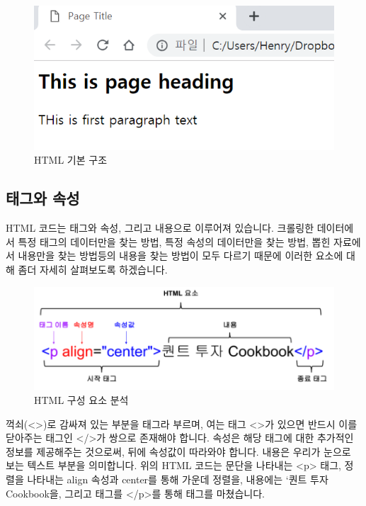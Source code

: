 \documentclass[12pt,]{book}
\begin{document}
\begin{figure}[h]

{\centering \includegraphics[width=0.7\linewidth]{images/html_1} 

}

\caption{HTML 기본 구조}\label{fig:unnamed-chunk-7}
\end{figure}

\hypertarget{section-7}{%
\subsection{태그와 속성}\label{section-7}}

HTML 코드는 태그와 속성, 그리고 내용으로 이루어져 있습니다. 크롤링한 데이터에서 특정 태그의 데이터만을 찾는 방법, 특정 속성의 데이터만을 찾는 방법, 뽑힌 자료에서 내용만을 찾는 방법등의 내용을 찾는 방법이 모두 다르기 때문에 이러한 요소에 대해 좀더 자세히 살펴보도록 하겠습니다.

\begin{figure}[h]

{\centering \includegraphics[width=0.7\linewidth]{images/html_2} 

}

\caption{HTML 구성 요소 분석}\label{fig:unnamed-chunk-8}
\end{figure}

꺽쇠(\textless{}\textgreater{})로 감싸져 있는 부분을 태그라 부르며, 여는 태그 \textless{}\textgreater{}가 있으면 반드시 이를 닫아주는 태그인 \textless{}/\textgreater{}가 쌍으로 존재해야 합니다. 속성은 해당 태그에 대한 추가적인 정보를 제공해주는 것으로써, 뒤에 속성값이 따라와야 합니다. 내용은 우리가 눈으로 보는 텍스트 부분을 의미합니다. 위의 HTML 코드는 문단을 나타내는 \textless{}p\textgreater{} 태그, 정렬을 나타내는 align 속성과 center를 통해 가운데 정렬을, 내용에는 `퀀트 투자 Cookbook을, 그리고 태그를 \textless{}/p\textgreater{}를 통해 태그를 마쳤습니다.
\end{document}
